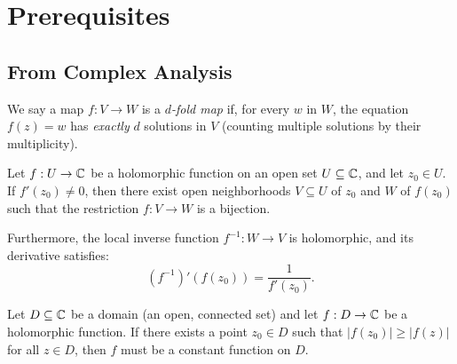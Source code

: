\maketitle

\chapter*{Prerequisites}

\section*{From Complex Analysis}

\begin{definition*}
    We say a map $f: V \to W$ is a \emph{$d$-fold map} if, for every $w$ in $W$,
    the equation $f(z) = w$ has \emph{exactly} $d$ solutions in $V$ (counting
    multiple solutions by their multiplicity).
\end{definition*}

\begin{theorem*}
    \label{thm:inverse_function_theorem_in_C}
    Let $f: U \to \mathbb{C}$ be a holomorphic function on an open set $U \subseteq \mathbb{C}$,
    and let $z_0 \in U$. If $f'(z_0) \neq 0$, then there exist open
    neighborhoods $V \subseteq U$ of $z_0$ and $W$ of $f(z_0)$ such that the
    restriction $f: V \to W$ is a bijection.
    
    Furthermore, the local inverse function $f^{-1}: W \to V$ is holomorphic,
    and its derivative satisfies:
    \begin{equation*}
        (f^{-1})'(f(z_0)) = \frac{1}{f'(z_0)}.
    \end{equation*}
\end{theorem*}

\begin{theorem*}
    Let $D \subseteq \mathbb{C}$ be a domain (an open, connected set) and let $f: D \to \mathbb{C}$
    be a holomorphic function. If there exists a point $z_0 \in D$ such that
    $|f(z_0)| \geq |f(z)|$ for all $z \in D$, then $f$ must be a constant
    function on $D$.
\end{theorem*}

